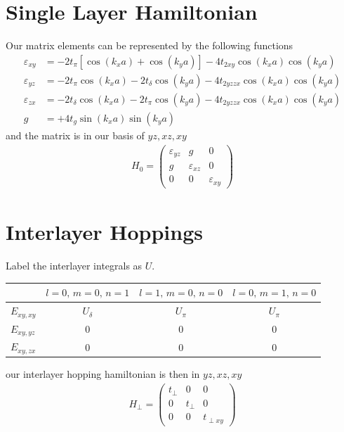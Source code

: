 \documentclass[11pt]{article}
\begin{document}
\section*{Single Layer Hamiltonian}
Our matrix elements can be represented by the following functions
\begin{align}
    \varepsilon_{xy} &= -2t_\pi \left[\cos(k_x a) + \cos(k_y a)\right] - 4t_{2xy} \cos(k_x a)\cos(k_y a) \\\nonumber
    \varepsilon_{yz} &= -2t_\pi \cos(k_x a) - 2t_\delta \cos(k_y a) - 4t_{2yzzx} \cos(k_x a)\cos(k_y a) \\\nonumber
    \varepsilon_{zx} &= -2t_\delta \cos(k_x a) - 2t_\pi \cos(k_y a) - 4t_{2yzzx} \cos(k_x a)\cos(k_y a) \\\nonumber
    g &= +4t_{g} \sin(k_x a)\sin(k_y a)
\end{align}
and the matrix is in our basis of $yz, xz, xy$
\begin{gather}
    H_0 = \begin{pmatrix}
        \varepsilon_{yz} & g & 0 \\
        g & \varepsilon_{xz} & 0 \\
        0 & 0 & \varepsilon_{xy}
    \end{pmatrix}
\end{gather}

\section*{Interlayer Hoppings}
 
Label the interlayer integrals as $U$.
 
\begin{table}[H]
\centering
\begin{tabular}{lccc}
\toprule
 & $l=0,\,m=0,\,n=1$ & $l=1,\,m=0,\,n=0$ & $l=0,\,m=1,\,n=0$ \\
\midrule
$E_{xy,xy}$ & $U_\delta$ & $U_\pi$ & $U_\pi$ \\
$E_{xy,yz}$ & $0$        & $0$     & $0$ \\
$E_{xy,zx}$ & $0$        & $0$     & $0$ \\
\bottomrule
\end{tabular}
\end{table}
our interlayer hopping hamiltonian is then in $yz, xz, xy$
\begin{gather}
    H_\perp = \begin{pmatrix}
        t_\perp & 0 & 0 \\
        0 & t_\perp & 0 \\
        0 & 0 & t_{\perp xy}
    \end{pmatrix}
\end{gather}
\end{document}
